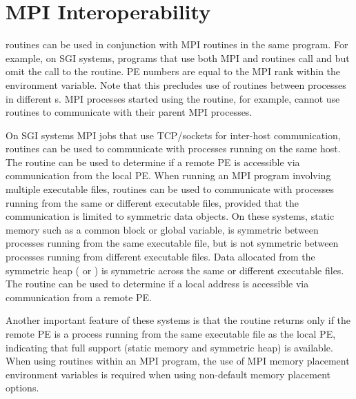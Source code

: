\section{\ac{MPI} Interoperability}
\begin{sloppypar} %
\openshmem routines can be used in conjunction with \ac{MPI}
routines  in the same program.  For example, on SGI systems, programs that use both \ac{MPI} and \openshmem routines call  and  but omit the call to the  routine.  \openshmem \ac{PE} numbers are equal to the \ac{MPI} rank within the  environment variable.  Note that this precludes use of \openshmem routines between processes in different s. 
\ac{MPI} processes started using the  routine, for
example, cannot use \openshmem routines to communicate with their parent
\ac{MPI} processes.
\end{sloppypar}
On SGI systems \ac{MPI} jobs that use TCP/sockets for inter-host communication, \openshmem routines can be used to communicate with processes running on the same host.  The  routine can be used to determine if a remote \ac{PE} is accessible via \openshmem communication from the local \ac{PE}. When running an \ac{MPI} program involving multiple executable files, \openshmem routines can be used to communicate with processes running from the same or different executable files, provided that the communication is limited to symmetric data objects.  On these systems, static memory such as a \Fortran{} common block or \Clang{} global variable, is symmetric between processes running from the same executable file, but is not symmetric between processes running from different executable files.  Data allocated from the symmetric heap ( or ) is symmetric across the same or different executable files. The routine  can be used to determine if a local address is accessible via \openshmem communication from a remote \ac{PE}.

 Another important feature of these systems is that the  routine returns  only if the remote \ac{PE} is a process running from the same executable file as the local PE, indicating that full \openshmem support (static memory and symmetric heap) is available.  When using \openshmem routines within an \ac{MPI} program, the use of \ac{MPI} memory placement environment variables is required when using non-default memory placement options.
